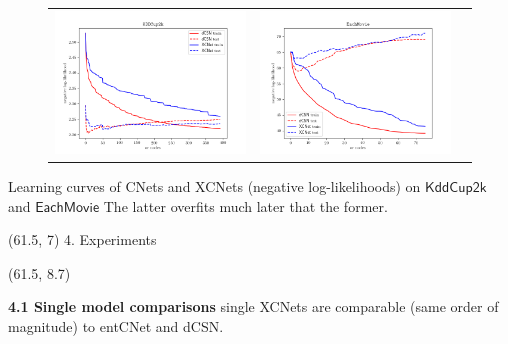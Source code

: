 \documentclass[final]{beamer}
\begin{document}
\begin{frame}{}
\begin{textblock}{17.5}
\begin{figure}[t]
  \label{fig:ll}
  \centering
  \begin{tabular}{ccc}
    \includegraphics[width=0.48\linewidth]{figures/kdd} &
    \includegraphics[width=0.48\linewidth]{figures/tmovie}
  \end{tabular}
\end{figure}
\hspace{50pt}
\begin{minipage}{0.8\linewidth}
  \vspace{-10pt}
\scriptsize  Learning curves of CNets and XCNets (negative
log-likelihoods) on $\mathsf{KddCup2k}$ and $\mathsf{EachMovie}$
The latter overfits much later that the former.
\end{minipage}
  \end{textblock}


  \begin{textblock}{17.5}(61.5, 7)
    4. Experiments
  \end{textblock}
  \begin{textblock}{17.5}(61.5, 8.7)

    {\bf 4.1 Single model comparisons}
    \small single XCNets are comparable (same order of magnitude) to
    \textsf{entCNet} and \textsf{dCSN}.
\vspace{10pt}
    
    \begin{minipage}{0.7\linewidth}
      \centering
    

\end{minipage}
\end{textblock}
\end{frame}
\end{document}
